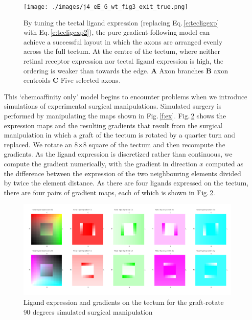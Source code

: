 \documentclass[11pt, a4paper]{article}
\begin{document}
\begin{figure}
\texttt{[image: ./images/j4\_eE\_G\_wt\_fig3\_exit\_true.png]}
\caption{By tuning the tectal ligand expression (replacing Eq.\,\ref{e:tecligexp} with
 Eq.\,\ref{e:tecligexp2}), the pure gradient-following model can achieve a
 successful layout in which the axons are arranged evenly across the full
 tectum. At the centre of the tectum, where neither retinal receptor
 expression nor tectal ligand expression is high, the ordering is weaker than
 towards the edge. \textbf{A} Axon branches \textbf{B} axon
 centroids \textbf{C} Five selected axons.}
\label{f:G0}
\end{figure}

This `chemoaffinity only' model begins to encounter problems when we introduce
simulations of experimental surgical manipulations. Simulated surgery is
performed by manipulating the maps shown in
Fig.\,\ref{f:ex}. Fig.\,\ref{f:trot90} shows the expression maps and the
resulting gradients that result from the surgical manipulation in which a
graft of the tectum is rotated by a quarter turn and replaced. We rotate an
8$\times$8 square of the tectum and then recompute the gradients. As the ligand
expression is discretized rather than continuous, we compute the gradient
numerically, with the gradient in direction $x$ computed as the difference
between the expression of the two neighbouring elements divided by twice the
element distance. As there are four ligands expressed on the tectum, there are
four pairs of gradient maps, each of which is shown in Fig.\,\ref{f:trot90}.

%
\begin{figure}
\includegraphics[width=\linewidth]{./images/Tissuevisb.png}
\caption{Ligand expression and gradients on the tectum for the
graft-rotate 90 degrees simulated surgical manipulation}
\label{f:trot90}
\end{figure}
\end{document}

